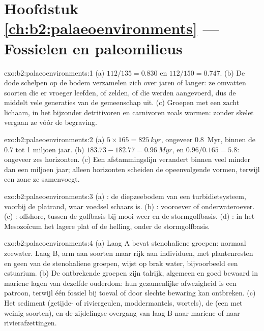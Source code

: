 \section*{Hoofdstuk \ref{ch:b2:palaeoenvironments} --- Fossielen en paleomilieus}

\begin{solution}{exo:b2:palaeoenvironments:1}
(a) $112/135 = 0.830$ en $112/150 = 0.747$. (b) De dode schelpen op de bodem verzamelen zich over jaren
of langer: ze omvatten soorten die er vroeger leefden, of zelden, of die werden aangevoerd, dus de
 middelt vele generaties van de gemeenschap uit. (c) Groepen met een zacht lichaam, in
het bijzonder detritivoren en carnivoren zoals wormen: zonder skelet vergaan ze vóór de begraving.
\end{solution}

\begin{solution}{exo:b2:palaeoenvironments:2}
(a) $5 \times 165 = \qty{825}{kyr}$, ongeveer \qty{0.8}{Myr}, binnen de 0.7 tot 1 miljoen jaar.
(b) $183.73 - 182.77 = \qty{0.96}{Myr}$, en $0.96/0.165 = 5.8$: ongeveer zes horizonten. (c) Een
afstammingslijn verandert binnen veel minder dan een miljoen jaar; alleen horizonten scheiden de opeenvolgende
vormen, terwijl een zone ze samenvoegt.
\end{solution}

\begin{solution}{exo:b2:palaeoenvironments:3}
(a) : de diepzeebodem van een turbidietsysteem, voorbij de platrand, waar
voedsel schaars is. (b) : vooroever of onderwateroever. (c) :
offshore, tussen de golfbasis bij mooi weer en de stormgolfbasis. (d) : in het
Mesozoïcum het lagere plat of de helling, onder de stormgolfbasis.
\end{solution}

\begin{solution}{exo:b2:palaeoenvironments:4}
(a) Laag A bevat stenohaliene groepen: normaal zeewater. Laag B, arm aan soorten maar rijk aan
individuen, met plantenresten en geen van de stenohaliene groepen, wijst op brak water, bijvoorbeeld
een estuarium. (b) De ontbrekende groepen zijn talrijk, algemeen en goed bewaard in mariene lagen
van dezelfde ouderdom: hun gezamenlijke afwezigheid is een patroon, terwijl één fossiel bij toeval of
door slechte bewaring kan ontbreken. (c) Het sediment (getijde- of riviergeulen, moddermantels, wortels), de
 (een  met weinig soorten), en de zijdelingse overgang van laag B naar
mariene of naar rivierafzettingen.
\end{solution}


